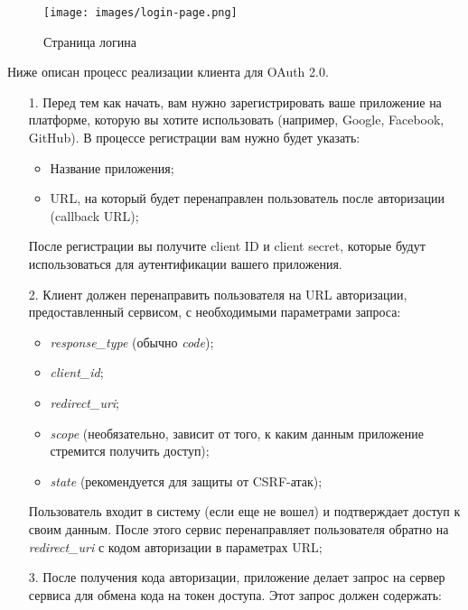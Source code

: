 \begin{figure}[htb]
	\centering
	\texttt{[image: images/login-page.png]}
	\parskip=6pt
	\caption{Страница логина}
	\label{fig:login-page}
\end{figure}

Ниже описан процесс реализации клиента для OAuth 2.0.

\begin{enumerate}[wide=0pt]
	\item[1.] Перед тем как начать, вам нужно зарегистрировать ваше приложение на платформе, которую вы хотите использовать (например, Google, Facebook, GitHub). В процессе регистрации вам нужно будет указать:
	
	\begin{itemize}[wide=0pt]
		\item Название приложения;
		\item URL, на который будет перенаправлен пользователь после авторизации (callback URL);
	\end{itemize}

	После регистрации вы получите client ID и client secret, которые будут использоваться для аутентификации вашего приложения.
	
	\item[2.] Клиент должен перенаправить пользователя на URL авторизации, предоставленный сервисом, с необходимыми параметрами запроса:
	
	\begin{itemize}[wide=0pt]
		\item \textit{response\_type} (обычно \textit{code});
		\item \textit{client\_id};
		\item \textit{redirect\_uri};
		\item \textit{scope} (необязательно, зависит от того, к каким данным приложение стремится получить доступ);
		\item \textit{state} (рекомендуется для защиты от CSRF-атак);
	\end{itemize}
	
	Пользователь входит в систему (если еще не вошел) и подтверждает доступ к своим данным. После этого сервис перенаправляет пользователя обратно на \textit{redirect\_uri} с кодом авторизации в параметрах URL;
	
	\item[3.] После получения кода авторизации, приложение делает запрос на сервер сервиса для обмена кода на токен доступа. Этот запрос должен содержать:
	

\end{enumerate}
